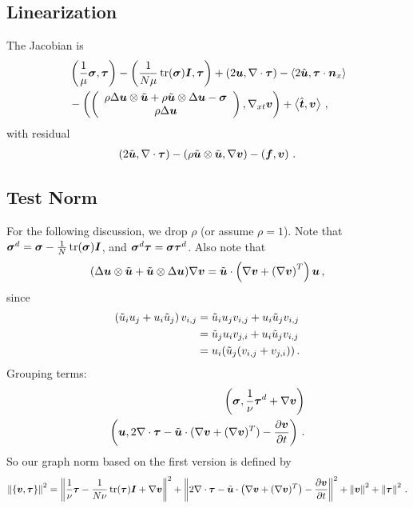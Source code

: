 \documentclass{article}
\begin{document}
\subsection*{Linearization}
The Jacobian is
\begin{align*}
&\LRp{\frac{1}{\mu}\bfsigma,\bftau}-\LRp{\frac{1}{N\mu}\trace(\bfsigma)\bfI,\bftau}+\LRp{2\bfu,\Div\bftau}-\LRa{2\hat\bfu,\bftau\cdot\bfn_x}\\
&-\LRp{\vecttwo{\rho\Delta\bfu\otimes\tilde\bfu+\rho\tilde\bfu\otimes\Delta\bfu-\bfsigma}{\rho\Delta\bfu},\Gradxt\bfv}+\LRa{\hat\bft,\bfv}\,,
\end{align*}
with residual
\begin{align*}
\LRp{2\tilde\bfu,\Div\bftau}
-\LRp{\rho\tilde\bfu\otimes\tilde\bfu,\Grad\bfv}-\LRp{\bff,\bfv}\,.
\end{align*}

\subsection*{Test Norm}
For the following discussion, we drop $\rho$ (or assume $\rho=1$).
Note that $\bfsigma^d=\bfsigma-\frac{1}{N}\trace(\bfsigma)\bfI$, and $\bfsigma^d\bftau=\bfsigma\bftau^d$.
Also note that 
\[
(\Delta\bfu\otimes\tilde\bfu+\tilde\bfu\otimes\Delta\bfu)\Grad\bfv=\tilde\bfu\cdot\LRp{\Grad\bfv+\LRp{\Grad\bfv}^T}\bfu\,,
\]
since
\begin{align*}
  \LRp{\tilde u_i u_j+u_i\tilde u_j}v_{i,j}&=\tilde u_i u_j v_{i,j}+u_i \tilde u_j v_{i,j}\\
  &=\tilde u_j u_i v_{j,i}+u_i \tilde u_j v_{i,j}\\
  &=u_i(\tilde u_j(v_{i,j}+v_{j,i}))\,.
\end{align*}
Grouping terms:
\begin{align*}
\LRp{\bfsigma,\frac{1}{\nu}\bftau^d+\Grad\bfv}\\
\LRp{\bfu,2\Div\bftau-\tilde\bfu\cdot(\Grad\bfv+(\Grad\bfv)^T)-\frac{\partial\bfv}{\partial t}}\,.
\end{align*}
So our graph norm based on the first version is defined by
\begin{equation*}
\norm{\LRc{\bfv,\bftau}}^2=\norm{\frac{1}{\nu}\bftau-\frac{1}{N\nu}\trace(\bftau)\bfI+\Grad\bfv}^2
+\norm{2\Div\bftau-\tilde\bfu\cdot\LRp{\Grad\bfv+(\Grad\bfv)^T}-\frac{\partial\bfv}{\partial t}}^2
+\norm{\bfv}^2
+\norm{\bftau}^2\,.
\end{equation*}
\end{document}
